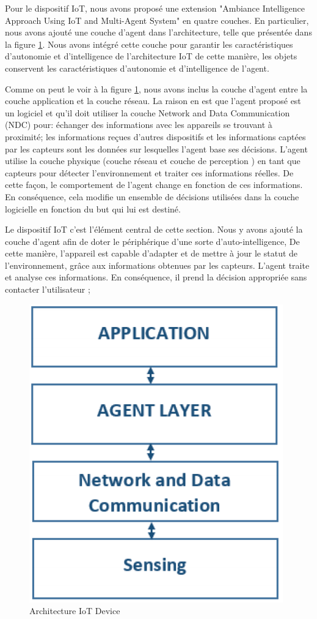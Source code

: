 Pour le dispositif IoT, nous avons proposé une extension  "Ambiance Intelligence Approach Using IoT and Multi-Agent System" \cite{zouai2019ambiance} en quatre couches. En particulier, nous avons ajouté une couche d'agent dans l'architecture, telle que présentée dans la figure \ref{fc11}. Nous avons intégré cette couche pour garantir les caractéristiques d'autonomie et d'intelligence de l'architecture IoT de cette manière, les objets conservent les caractéristiques d'autonomie et d'intelligence de l'agent.


Comme on peut le voir à la figure \ref{fc11}, nous avons inclus la couche d'agent entre la couche application et la couche réseau. La raison en est que l'agent proposé est un logiciel et qu'il doit utiliser la couche Network and Data Communication (NDC) pour: échanger des informations avec les appareils se trouvant à proximité; les informations reçues d'autres dispositifs et les informations captées par les capteurs sont les données sur lesquelles l'agent base ses décisions. L'agent utilise la couche physique (couche réseau et couche de perception ) en tant que capteurs pour détecter l'environnement et traiter ces informations réelles. De cette façon, le comportement de l'agent change en fonction de ces informations. En conséquence, cela modifie un ensemble de décisions utilisées dans la couche logicielle en fonction du but qui lui est destiné.


Le dispositif  IoT c'est l'élément central de cette section. Nous y avons ajouté la couche d'agent afin de doter le périphérique d'une sorte d'auto-intelligence, De cette manière, l'appareil est capable d'adapter et de mettre à jour le statut de l'environnement, grâce aux informations obtenues par les capteurs. L'agent traite et analyse ces informations. En conséquence, il prend la décision appropriée sans contacter l'utilisateur \cite{zouai2019ambiance};
\begin{figure}[H]
\centering
\includegraphics[scale=0.6]{chap1/fc11.png}
\caption{Architecture IoT Device}
\label{fc11}
\end{figure}

